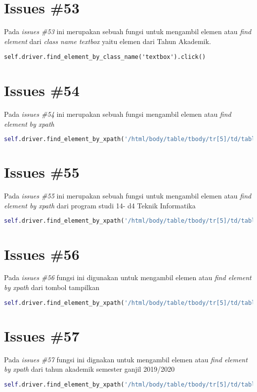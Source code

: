 \section{Issues \#53}
Pada \textit{issues \#53} ini merupakan sebuah fungsi untuk mengambil elemen atau \textit{find element} dari \textit{class name textbox} yaitu elemen dari Tahun Akademik.
\begin{verbatim}
self.driver.find_element_by_class_name('textbox').click()
\end{verbatim}

\section{Issues \#54}
Pada \textit{issues \#54} ini merupakan sebuah fungsi mengambil elemen atau \textit{find element} \textit{by xpath}
\begin{lstlisting}[language=Python]
self.driver.find_element_by_xpath('/html/body/table/tbody/tr[5]/td/table[3]/tbody/tr[1]/td[2]/p/table/tbody/tr[2]/td[2]/select/option[1]').click()
\end{lstlisting}

\section{Issues \#55}
Pada \textit{issues \#55} ini merupakan sebuah fungsi untuk mengambil elemen atau \textit{find element by xpath} dari program studi 14- d4 Teknik Informatika
\begin{lstlisting}[language=Python]
self.driver.find_element_by_xpath('/html/body/table/tbody/tr[5]/td/table[3]/tbody/tr[1]/td[2]/p[1]/table/tbody/tr[4]/td[2]/select/option[2]').click()
\end{lstlisting}



\section{Issues \#56}
Pada \textit{issues \#56} fungsi ini digunakan untuk mengambil elemen atau \textit{find element by xpath} dari tombol tampilkan
\begin{lstlisting}[language=Python]
  self.driver.find_element_by_xpath('/html/body/table/tbody/tr[5]/td/table[3]/tbody/tr[1]/td[2]/p/table/tbody/tr[5]/td/input').click()
\end{lstlisting}


\section{Issues \#57}
Pada \textit{issues \#57}  fungsi ini dignakan untuk mengambil elemen atau \textit{find element by xpath} dari tahun akademik semester ganjil 2019/2020
\begin{lstlisting}[language=Python]
 self.driver.find_element_by_xpath('/html/body/table/tbody/tr[5]/td/table[3]/tbody/tr[1]/td[2]/p/table/tbody/tr[2]/td[2]/select/option[2]').click()
\end{lstlisting}


